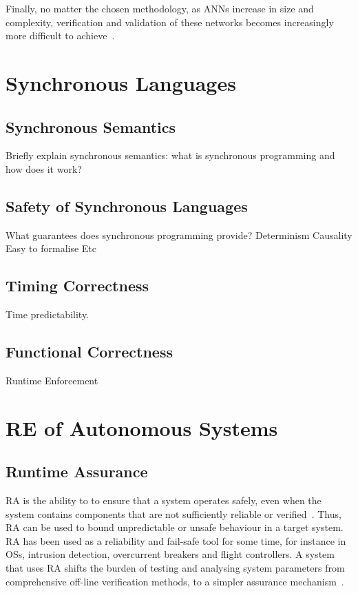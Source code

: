 Finally, no matter the chosen methodology, as \acp{ANN} increase in size and complexity, verification and validation of these networks becomes increasingly more difficult to achieve~\cite{Gehr2018AI2SA}.


\section{Synchronous Languages}
\subsection{Synchronous Semantics}
Briefly explain synchronous semantics: what is synchronous programming and how does it work?

\subsection{Safety of Synchronous Languages}
What guarantees does synchronous programming provide?
Determinism
Causality
Easy to formalise
Etc

\subsection{Timing Correctness}
Time predictability.

\subsection{Functional Correctness}
Runtime Enforcement






\section{\acf{RE} of Autonomous Systems}

\subsection{Runtime Assurance}
\ac{RA} is the ability to to ensure that a system operates safely, even when the system contains components that are not sufficiently reliable or verified~\cite{rta-cps}. 
Thus, \ac{RA} can be used to bound unpredictable or unsafe behaviour in a target system. 
\ac{RA} has been used as a reliability and fail-safe tool for some time, for instance in \acp{OS}, intrusion detection, overcurrent breakers and flight controllers. 
A system that uses \ac{RA} shifts the burden of testing and analysing system parameters from comprehensive off-line verification methods, to a simpler assurance mechanism~\cite{rta-cps}. 


